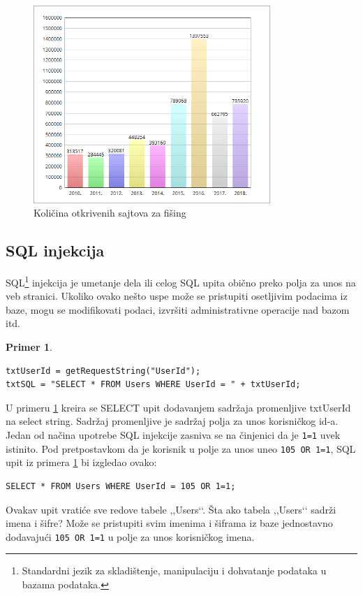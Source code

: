 \documentclass[a4paper]{article}
\theoremstyle{break}
\newtheorem{primer}{Primer}[subsection]
\begin{document}
{\begin{figure}[h!]
\begin{center}
\includegraphics[height=0.4\textwidth, width=0.8\textwidth]{phishing.png}
\end{center}
\caption{Količina otkrivenih sajtova za fišing}
\label{fig:phishing_napadi}
\end{figure}
\subsection{SQL injekcija}
\label{subsec:sql}

SQL\footnote{Standardni jezik za skladištenje, manipulaciju i dohvatanje podataka u bazama podataka.} injekcija je umetanje dela ili celog SQL upita obično preko polja za unos na veb stranici. Ukoliko ovako nešto uspe može se pristupiti osetljivim podacima iz baze, mogu se modifikovati podaci, izvršiti administrativne operacije nad bazom itd. 

\begin{primer}
\label{primer_1}
\begin{lstlisting}[frame=single]
txtUserId = getRequestString("UserId");
txtSQL = "SELECT * FROM Users WHERE UserId = " + txtUserId;
\end{lstlisting}
\end{primer}
\noindent U primeru \ref{primer_1} kreira se SELECT upit dodavanjem sadržaja promenljive txtUserId na select string. Sadržaj promenljive je sadržaj polja za unos korisničkog id-a.\\

Jedan od načina upotrebe SQL injekcije zasniva se na činjenici da je \texttt{1=1} uvek istinito. Pod pretpostavkom da je korisnik u polje za unos uneo \texttt{105 OR 1=1}, SQL upit iz primera \ref{primer_1} bi izgledao ovako:

\begin{lstlisting}[frame=single]
SELECT * FROM Users WHERE UserId = 105 OR 1=1;
\end{lstlisting}
\noindent Ovakav upit vratiće sve redove tabele ,,Users‘‘. Šta ako tabela ,,Users‘‘ sadrži imena i šifre? Može se pristupiti svim imenima i šiframa iz baze jednostavno dodavajući \texttt{105 OR 1=1} u polje za unos korisničkog imena.\\

}
\end{document}
